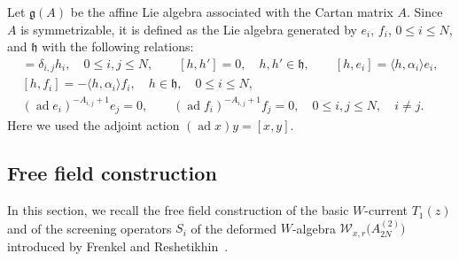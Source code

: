\documentclass[10pt,a4paper]{amsart}
\numberwithin{equation}{section}
\begin{document}
Let ${\mathfrak g}(A)$
be the affine Lie algebra associated with the Cartan matrix $A$.
Since $A$ is symmetrizable, it is defined as the Lie algebra generated by
$e_i$, $f_i$, $0\leq i \leq N$, and ${\mathfrak h}$ with the following relations:
\begin{gather*}
[e_i, f_j]=\delta_{i,j} h_i, \quad 0\leq i,j \leq N,\qquad
[h,h']=0, \quad h,h' \in {\mathfrak h},\qquad
[h, e_i]=\langle h, \alpha_i\rangle e_i,
\\
[h, f_i]=-\langle h, \alpha_i\rangle f_i,\quad h \in {\mathfrak h}, \quad 0\leq i \leq N,
\\
(\operatorname{ad}e_i)^{-A_{i,j}+1}e_j=0,\qquad
(\operatorname{ad}f_i)^{-A_{i,j}+1}f_j=0, \quad
0\leq i, j \leq N, \quad i \neq j.
\end{gather*}
Here we used the adjoint action $(\operatorname{ad}x) y=[x,y]$.

\subsection{Free field construction}

In this section, we recall the free field construction of
the basic $W$-current $T_1(z)$
and {of} the screening operators $S_i$
of the deformed $W$-algebra ${\mathcal W}_{x,r}\big(A_{2N}^{(2)}\big)$ introduced
by Frenkel and Reshe\-ti\-khin~\cite{Frenkel-Reshetikhin1}.
\end{document}
